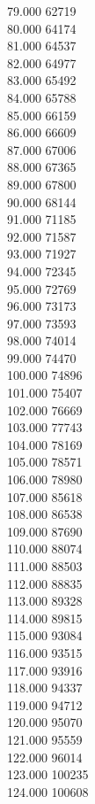 { 79.000	62719 \\
 80.000	64174 \\
 81.000	64537 \\
 82.000	64977 \\
 83.000	65492 \\
 84.000	65788 \\
 85.000	66159 \\
 86.000	66609 \\
 87.000	67006 \\
 88.000	67365 \\
 89.000	67800 \\
 90.000	68144 \\
 91.000	71185 \\
 92.000	71587 \\
 93.000	71927 \\
 94.000	72345 \\
 95.000	72769 \\
 96.000	73173 \\
 97.000	73593 \\
 98.000	74014 \\
 99.000	74470 \\
 100.000	74896 \\
 101.000	75407 \\
 102.000	76669 \\
 103.000	77743 \\
 104.000	78169 \\
 105.000	78571 \\
 106.000	78980 \\
 107.000	85618 \\
 108.000	86538 \\
 109.000	87690 \\
 110.000	88074 \\
 111.000	88503 \\
 112.000	88835 \\
 113.000	89328 \\
 114.000	89815 \\
 115.000	93084 \\
 116.000	93515 \\
 117.000	93916 \\
 118.000	94337 \\
 119.000	94712 \\
 120.000	95070 \\
 121.000	95559 \\
 122.000	96014 \\
 123.000	100235 \\
 124.000	100608 \\
}
